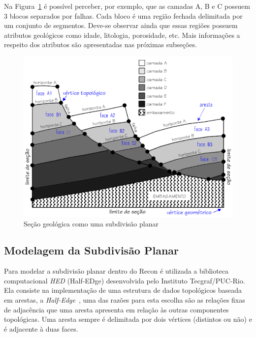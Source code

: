 Na Figura~\ref{fig-subdivisao-planar} é possível perceber, por exemplo, que as camadas A, B e C possuem 3 blocos separados por falhas. Cada bloco é uma região fechada delimitada por um conjunto de segmentos. Deve-se observar ainda que essas regiões possuem atributos geológicos como idade, litologia, porosidade, etc. Mais informações a respeito dos atributos são apresentadas nas próximas subseções.

\begin{figure} [h]
  \begin{center}
    \includegraphics[width=\textwidth]{images/fig-subdivisao-planar}
    \caption{Seção geológica como uma subdivisão planar~\cite{Ferraz}}\label{fig-subdivisao-planar}
  \end{center}
\end{figure}

\subsection{Modelagem da Subdivisão Planar}

Para modelar a subdivisão planar dentro do Recon é utilizada a biblioteca computacional \emph{HED} (Half-EDge) desenvolvida pelo Instituto Tecgraf/PUC-Rio. Ela consiste na implementação de uma estrutura de dados topológicos baseada em arestas, a \textit{Half-Edge}~\cite{HED}, uma das razões para esta escolha são as relações fixas de adjacência que uma aresta apresenta em relação às outras componentes topológicas. Uma aresta sempre é delimitada por dois vértices (distintos ou não) e é adjacente à duas faces.

